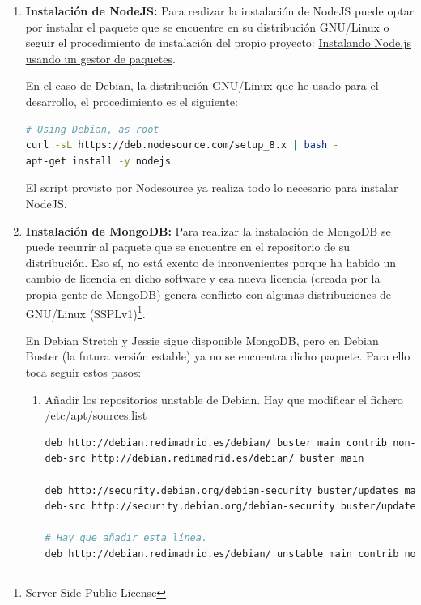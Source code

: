 \documentclass[spanish,12pt, a4paper, twoside]{paper}
\begin{document}
\begin{enumerate}
\item\textbf{Instalación de NodeJS:} Para realizar la instalación de NodeJS puede optar por instalar el paquete que se encuentre en su distribución GNU/Linux o seguir el procedimiento de instalación del propio proyecto: \href{https://nodejs.org/es/download/package-manager/}{Instalando Node.js usando un gestor de paquetes}.
\newline

En el caso de Debian, la distribución GNU/Linux que he usado para el desarrollo, el procedimiento es el siguiente:

\begin{lstlisting}[language=sh]
# Using Debian, as root
curl -sL https://deb.nodesource.com/setup_8.x | bash -
apt-get install -y nodejs
\end{lstlisting}

El script provisto por Nodesource ya realiza todo lo necesario para instalar NodeJS.

\item\textbf{Instalación de MongoDB:} Para realizar la instalación de MongoDB se puede recurrir al paquete que se encuentre en el repositorio de su distribución. Eso sí, no está exento de inconvenientes porque ha habido un cambio de licencia en dicho software y esa nueva licencia (creada por la propia gente de MongoDB) genera conflicto con algunas distribuciones de GNU/Linux (SSPLv1)\footnote{Server Side Public License}.

En Debian Stretch y Jessie sigue disponible MongoDB, pero en Debian Buster (la futura versión estable) ya no se encuentra dicho paquete. Para ello toca seguir estos pasos:

\begin{enumerate}
\item Añadir los repositorios unstable de Debian. Hay que modificar el fichero /etc/apt/sources.list
\begin{lstlisting}[language=sh]
deb http://debian.redimadrid.es/debian/ buster main contrib non-free
deb-src http://debian.redimadrid.es/debian/ buster main

deb http://security.debian.org/debian-security buster/updates main
deb-src http://security.debian.org/debian-security buster/updates main

# Hay que añadir esta línea.
deb http://debian.redimadrid.es/debian/ unstable main contrib non-free
\end{lstlisting}


\end{enumerate}
\end{enumerate}
\end{document}
